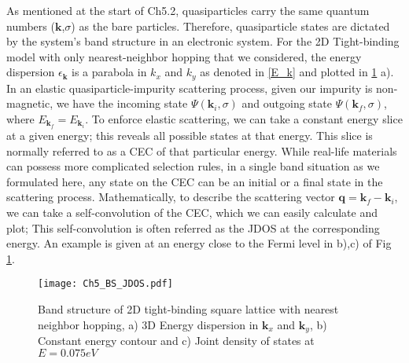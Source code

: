 As mentioned at the start of Ch5.2, quasiparticles carry the same quantum numbers ($\textbf{k}$,$\sigma$) as the bare particles. Therefore, quasiparticle states are dictated by the system's band structure in an electronic system. For the 2D Tight-binding model with only nearest-neighbor hopping that we considered, the energy dispersion $\epsilon_{\mathbf{k}}$ is a parabola in $k_x$ and $k_y$ as denoted in \ref{E_k} and plotted in \ref{fig:ch5_bs} a). In an elastic quasiparticle-impurity scattering process, given our impurity is non-magnetic, we have the incoming state $\Psi(\textbf{k}_i,\sigma)$ and outgoing state $\Psi(\textbf{k}_f,\sigma)$, where $E_{\textbf{k}_f} = E_{\textbf{k}_i}$. To enforce elastic scattering, we can take a constant energy slice at a given energy; this reveals all possible states at that energy. This slice is normally referred to as a \ac{CEC} of that particular energy. While real-life materials can possess more complicated selection rules, in a single band situation as we formulated here, any state on the \ac{CEC} can be an initial or a final state in the scattering process. Mathematically, to describe the scattering vector $\textbf{q} = \textbf{k}_f -\textbf{k}_i$, we can take a self-convolution of the \ac{CEC}, which we can easily calculate and plot; This self-convolution is often referred as the \ac{JDOS} at the corresponding energy. An example is given at an energy close to the Fermi level in b),c) of Fig \ref{fig:ch5_bs}. 
\begin{figure}
	\centering
	\texttt{[image: Ch5\_BS\_JDOS.pdf]} 
	\caption{Band structure of 2D tight-binding square lattice with nearest neighbor hopping, a) 3D Energy dispersion in $\textbf{k}_x$ and $\textbf{k}_y$, b) Constant energy contour and c) Joint density of states at $E=0.075eV$}
	\label{fig:ch5_bs}
\end{figure}

